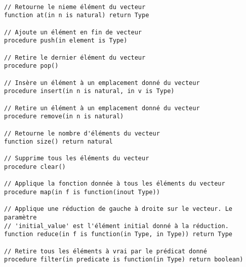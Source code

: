 \begin{verbatim}

// Retourne le nieme élément du vecteur
function at(in n is natural) return Type

// Ajoute un élément en fin de vecteur
procedure push(in element is Type)

// Retire le dernier élément du vecteur
procedure pop()

// Insère un élément à un emplacement donné du vecteur
procedure insert(in n is natural, in v is Type)

// Retire un élément à un emplacement donné du vecteur
procedure remove(in n is natural)

// Retourne le nombre d'éléments du vecteur
function size() return natural

// Supprime tous les éléments du vecteur
procedure clear()

// Applique la fonction donnée à tous les éléments du vecteur
procedure map(in f is function(inout Type))

// Applique une réduction de gauche à droite sur le vecteur. Le paramètre
// 'initial_value' est l'élément initial donné à la réduction.
function reduce(in f is function(in Type, in Type)) return Type

// Retire tous les éléments à vrai par le prédicat donné
procedure filter(in predicate is function(in Type) return boolean)

\end{verbatim}

